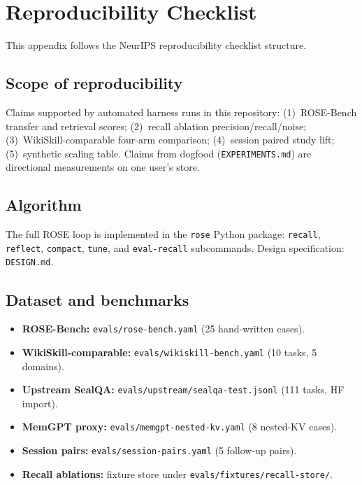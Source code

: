 \section{Reproducibility Checklist}
\label{app:repro}

This appendix follows the NeurIPS reproducibility checklist structure.

\subsection{Scope of reproducibility}

Claims supported by automated harness runs in this repository:
(1)~ROSE-Bench transfer and retrieval scores;
(2)~recall ablation precision/recall/noise;
(3)~WikiSkill-comparable four-arm comparison;
(4)~session paired study lift;
(5)~synthetic scaling table.
Claims from dogfood (\texttt{EXPERIMENTS.md}) are directional measurements on one user's store.

\subsection{Algorithm}

The full ROSE loop is implemented in the \texttt{rose} Python package:
\texttt{recall}, \texttt{reflect}, \texttt{compact}, \texttt{tune}, and \texttt{eval-recall} subcommands.
Design specification: \texttt{DESIGN.md}.

\subsection{Dataset and benchmarks}

\begin{itemize}
  \item \textbf{ROSE-Bench:} \texttt{evals/rose-bench.yaml} (25 hand-written cases).
  \item \textbf{WikiSkill-comparable:} \texttt{evals/wikiskill-bench.yaml} (10 tasks, 5 domains).
  \item \textbf{Upstream SealQA:} \texttt{evals/upstream/sealqa-test.jsonl} (111 tasks, HF import).
  \item \textbf{MemGPT proxy:} \texttt{evals/memgpt-nested-kv.yaml} (8 nested-KV cases).
  \item \textbf{Session pairs:} \texttt{evals/session-pairs.yaml} (5 follow-up pairs).
  \item \textbf{Recall ablations:} fixture store under \texttt{evals/fixtures/recall-store/}.
\end{itemize}

